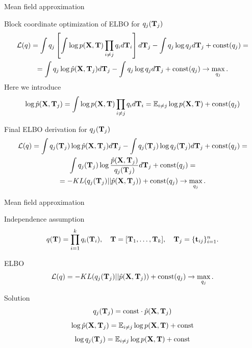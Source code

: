 \begin{frame}{Mean field approximation}
	\footnotesize
	\begin{block}{Block coordinate optimization of ELBO for $q_j(\mathbf{T}_j)$}
		\vspace{-0.4cm}
	    \begin{multline*}
			\mathcal{L} (q) 
			= \int q_j \left[\int \log p(\mathbf{X}, \mathbf{T}) \prod_{i \neq j} q_i d \mathbf{T}_i \right] d \mathbf{T}_j
			- \int q_j \log q_j  d\mathbf{T}_j + \text{const}(q_j) = \\
			= \int q_j \log \hat{p}(\mathbf{X}, \mathbf{T}_j) d \mathbf{T}_j 
			- \int q_j \log q_j d\mathbf{T}_j + \text{const}(q_j) \rightarrow \max_{q_j}.
		\end{multline*}
		Here we introduce
		\[
		   \log \hat{p}(\mathbf{X}, \mathbf{T}_j) = \int \log p(\mathbf{X}, \mathbf{T}) \prod_{i \neq j} q_i d \mathbf{T}_i = \mathbb{E}_{i \neq j} \log p(\mathbf{X}, \mathbf{T}) + \text{const}(q_j)
		\]
	    \end{block}
	    \vspace{-0.3cm}
	    \begin{block}{Final ELBO derivation for $q_j(\mathbf{T}_j)$}
	    	\vspace{-0.5cm}
			\begin{multline*}
	    		\mathcal{L} (q)
	    		= \int q_j (\mathbf{T}_j) \log \hat{p}(\mathbf{X}, \mathbf{T}_j) d \mathbf{T}_j - \int q_j(\mathbf{T}_j) \log q_j(\mathbf{T}_j) d\mathbf{T}_j + \text{const}(q_j) = \\
	    		 \int q_j (\mathbf{T}_j) \log \frac{\hat{p}(\mathbf{X}, \mathbf{T}_j)}{q_j(\mathbf{T}_j)} d\mathbf{T}_j + \text{const}(q_j) = \\
	    		= - KL (q_j(\mathbf{T}_j) || \hat{p}(\mathbf{X}, \mathbf{T}_j)) + \text{const}(q_j) \rightarrow \max_{q_j}.
	    	\end{multline*}
	    \end{block}
\end{frame}
\begin{frame}{Mean field approximation}   
	 \begin{block}{Independence assumption}
		\vspace{-0.3cm}
		\[
		q(\mathbf{T}) = \prod_{i=1}^k q_i(\mathbf{T}_i), \quad \mathbf{T} = [\mathbf{T}_1, \dots, \mathbf{T}_k], \quad \mathbf{T}_j = \{ \mathbf{t}_{ij}\}_{i=1}^n.
		\]
		\vspace{-0.3cm}
	\end{block}
	\begin{block}{ELBO}
	    \[
			\mathcal{L} (q) = - KL (q_j(\mathbf{T}_j) || \hat{p}(\mathbf{X}, \mathbf{T}_j))  + \text{const}(q_j) \rightarrow \max_{q_j}.
	    \]
	    \vspace{-0.3cm}
	\end{block}
	 \begin{block}{Solution}
	 	\vspace{-0.3cm}
		 \[
		    q_j(\mathbf{T}_j) = \text{const} \cdot \hat{p}(\mathbf{X}, \mathbf{T}_j)
		 \]
		 \[
		 	\log \hat{p}(\mathbf{X}, \mathbf{T}_j) = \mathbb{E}_{i \neq j} \log p(\mathbf{X}, \mathbf{T}) + \text{const}
		 \]
		 \[
		     \log q_j(\mathbf{T}_j) = \mathbb{E}_{i \neq j} \log p(\mathbf{X}, \mathbf{T}) + \text{const}
		 \]
		 \vspace{-0.3cm}
	 \end{block}
\end{frame}
